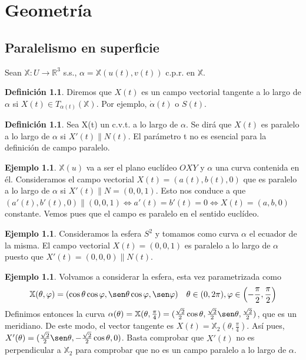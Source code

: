 \documentclass[twoside]{report}
\theoremstyle{definition}
\newtheorem{defi}[theorem]{Definición}
\newtheorem{example}[theorem]{Ejemplo}
\numberwithin{equation}{section}
\newcommand{\R}{\mathbb{R}}
\newcommand{\X}{\mathbb{X}}
\begin{document}
\chapter{Geometría}
\section{Paralelismo en superficie}
Sean $\X:U\to\R^3$ s.s., $\alpha=\X(u(t),v(t))$ c.p.r. en $\X$.

\begin{defi}
Diremos que $X(t)$ es un campo vectorial tangente a lo largo de $\alpha$ si $X(t) \in T_{\alpha(t)}(\X)$. Por ejemplo, $\dot{\alpha}(t)$ o $S(t)$.
\end{defi}

\begin{defi}
Sea X(t) un c.v.t. a lo largo de $\alpha$. Se dirá que $X(t)$ es paralelo a lo largo de $\alpha$ si $X'(t) \parallel N(t)$. El parámetro t no es esencial para la definición de campo paralelo.
\end{defi}

\begin{example}
$\X(u)$ va a ser el plano euclídeo $OXY$ y $\alpha$ una curva contenida en él. Consideramos el campo vectorial $X(t)=(a(t),b(t),0)$ que es paralelo a lo largo de $\alpha$ si $X'(t)\parallel N=(0,0,1)$. Esto nos conduce a que $(a'(t),b'(t),0)\parallel (0,0,1)\Leftrightarrow a'(t)=b'(t)=0\Leftrightarrow X(t)=(a,b,0)$ constante. Vemos pues que el campo es paralelo en el sentido euclídeo.
\end{example}

\begin{example}
Consideramos la esfera $S^2$ y tomamos como curva $\alpha$ el ecuador de la misma. El campo vectorial $X(t)=(0,0,1)$ es paralelo a lo largo de $\alpha$ puesto que $X'(t)=(0,0,0)\parallel N(t)$.
\end{example}

\begin{example}
Volvamos a considerar la esfera, esta vez parametrizada como
\[ \X(\theta,\varphi)=(\cos\theta\cos\varphi,\sen\theta\cos\varphi,\sen\varphi)\quad \theta\in(0,2\pi),\varphi\in\left(-\frac{\pi}{2},\frac{\pi}{2}\right)\]
Definimos entonces la curva $\alpha(\theta)=\X(\theta,\frac{\pi}{4})=(\frac{\sqrt{2}}{2}\cos\theta,\frac{\sqrt{2}}{2}\sen\theta,\frac{\sqrt{2}}{2})$, que es un meridiano. De este modo, el vector tangente es $X(t)=\X_2(\theta,\frac{\pi}{4})$. Así pues, $X'(\theta)=(\frac{\sqrt{2}}{2}\sen\theta,-\frac{\sqrt{2}}{2}\cos\theta,0)$. Basta comprobar que $X'(t)$ no es perpendicular a $\X_2$ para comprobar que no es un campo paralelo a lo largo de $\alpha$.
\end{example}
\end{document}
